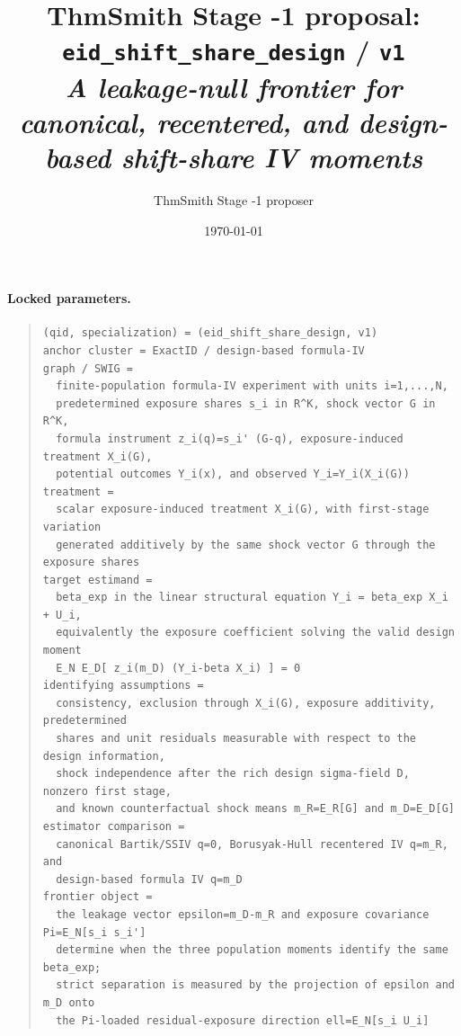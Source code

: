 \documentclass[11pt]{article}
\title{ThmSmith Stage -1 proposal: \texttt{eid\_shift\_share\_design} / \texttt{v1}%
  \\ \large\textit{A leakage-null frontier for canonical, recentered, and design-based shift-share IV moments}}
\author{ThmSmith Stage -1 proposer}
\date{\today}
\theoremstyle{definition}
\theoremstyle{plain}
\theoremstyle{remark}
\begin{document}
\maketitle


\paragraph{Locked parameters.}
\begin{quote}\small
\begin{verbatim}
(qid, specialization) = (eid_shift_share_design, v1)
anchor cluster = ExactID / design-based formula-IV
graph / SWIG =
  finite-population formula-IV experiment with units i=1,...,N,
  predetermined exposure shares s_i in R^K, shock vector G in R^K,
  formula instrument z_i(q)=s_i' (G-q), exposure-induced treatment X_i(G),
  potential outcomes Y_i(x), and observed Y_i=Y_i(X_i(G))
treatment =
  scalar exposure-induced treatment X_i(G), with first-stage variation
  generated additively by the same shock vector G through the exposure shares
target estimand =
  beta_exp in the linear structural equation Y_i = beta_exp X_i + U_i,
  equivalently the exposure coefficient solving the valid design moment
  E_N E_D[ z_i(m_D) (Y_i-beta X_i) ] = 0
identifying assumptions =
  consistency, exclusion through X_i(G), exposure additivity, predetermined
  shares and unit residuals measurable with respect to the design information,
  shock independence after the rich design sigma-field D, nonzero first stage,
  and known counterfactual shock means m_R=E_R[G] and m_D=E_D[G]
estimator comparison =
  canonical Bartik/SSIV q=0, Borusyak-Hull recentered IV q=m_R, and
  design-based formula IV q=m_D
frontier object =
  the leakage vector epsilon=m_D-m_R and exposure covariance Pi=E_N[s_i s_i']
  determine when the three population moments identify the same beta_exp;
  strict separation is measured by the projection of epsilon and m_D onto
  the Pi-loaded residual-exposure direction ell=E_N[s_i U_i]
\end{verbatim}
\end{quote}
\end{document}
